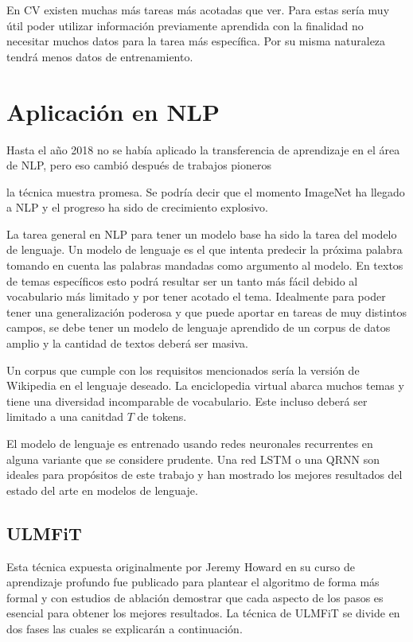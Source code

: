 En CV existen muchas más tareas más acotadas que ver. Para estas sería muy útil poder utilizar información previamente aprendida con la finalidad no necesitar muchos datos para la tarea más específica. Por su misma naturaleza tendrá menos datos de entrenamiento.

\section{Aplicación en NLP}

Hasta el año 2018 no se había aplicado la transferencia de aprendizaje en el área de NLP, pero eso cambió después de trabajos pioneros

la técnica muestra promesa. Se podría decir que el momento ImageNet ha llegado a NLP y el progreso ha sido de crecimiento explosivo.

La tarea general en NLP para tener un modelo base ha sido la tarea del modelo de lenguaje. Un modelo de lenguaje es el que intenta predecir la próxima palabra tomando en cuenta las palabras mandadas como argumento al modelo. En textos de temas específicos esto podrá resultar ser un tanto más fácil debido al vocabulario más limitado y por tener acotado el tema. Idealmente para poder tener una generalización poderosa y que puede aportar en tareas de muy distintos campos, se debe tener un modelo de lenguaje aprendido de un corpus de datos amplio y la cantidad de textos deberá ser masiva.

Un corpus que cumple con los requisitos mencionados sería la versión de Wikipedia en el lenguaje deseado. La enciclopedia virtual abarca muchos temas y tiene una diversidad incomparable de vocabulario. Este incluso deberá ser limitado a una canitdad $T$ de tokens.

El modelo de lenguaje es entrenado usando redes neuronales recurrentes en alguna variante que se considere prudente. Una red LSTM o una QRNN son ideales para propósitos de este trabajo y han mostrado los mejores resultados del estado del arte en modelos de lenguaje.

\subsection{ULMFiT}

Esta técnica expuesta originalmente por Jeremy Howard en su curso de aprendizaje profundo fue publicado para plantear el algoritmo de forma más formal y con estudios de ablación demostrar que cada aspecto de los pasos es esencial para obtener los mejores resultados. La técnica de ULMFiT se divide en dos fases las cuales se explicarán a continuación.

